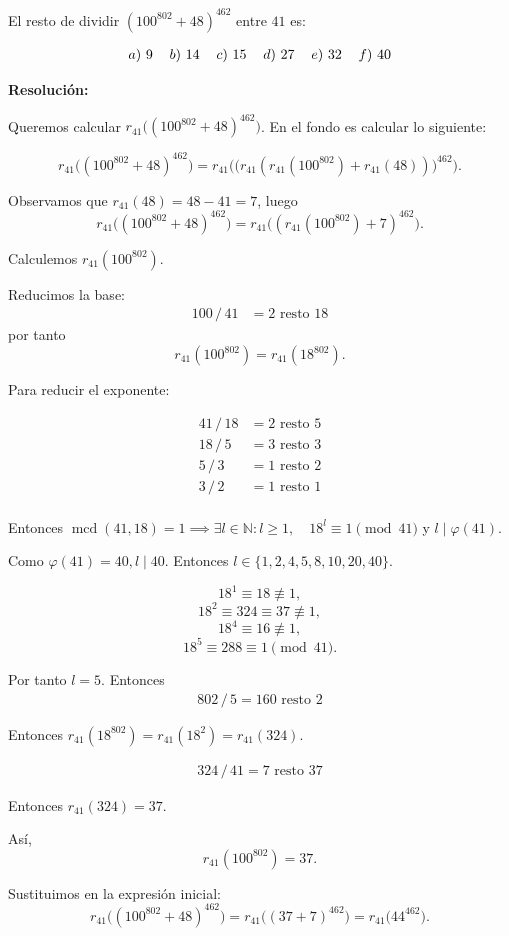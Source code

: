 \documentclass[a4paper,12pt]{article}
\begin{document}
\begin{ejercicioExamen}[title=Ejercicio 4]
El resto de dividir \( (100^{802} + 48)^{462} \) entre \( 41 \) es:

\[
\begin{tabular}{c c c c c c}
$a)$ 9 & $b)$ 14 & $c)$ 15 & $d)$ 27 & $e)$ 32 & $f)$ 40
\end{tabular}
\]

\tcblower
\textbf{Resolución:}

Queremos calcular \(r_{41}\big((100^{802}+48)^{462}\big)\). En el fondo es calcular lo siguiente:

\[
r_{41}\big((100^{802}+48)^{462}\big)
= r_{41}\Big(\big(r_{41}(r_{41}(100^{802})+r_{41}(48))\big)^{462}\Big).
\]

Observamos que \(r_{41}(48)=48-41=7\), luego
\[
r_{41}\big((100^{802}+48)^{462}\big)
= r_{41}\big((r_{41}(100^{802})+7)^{462}\big).
\]

Calculemos \(r_{41}(100^{802})\).

Reducimos la base:
\[
\begin{aligned}
100\,/\,41 &= 2 \text{ resto } 18
\end{aligned}
\]
por tanto
\[
r_{41}(100^{802}) = r_{41}(18^{802}).
\]

Para reducir el exponente:

\[
\begin{aligned}
41\,/\,18 &= 2 \text{ resto } 5 \\
18\,/\,5 &= 3 \text{ resto } 3 \\
5\,/\,3 &= 1 \text{ resto } 2 \\
3\,/\,2 &= 1 \text{ resto } \boxed{1} \\
\end{aligned}
\]

Entonces $\operatorname{mcd}(41,18) = 1 \implies \exists l \in \mathbb{N} : l \ge 1, \quad 18^l \equiv 1 \pmod{41}$ y $l \mid \varphi(41)$.

\vspace{0.5em}

Como $\varphi(41) = 40, l \mid 40$. Entonces \(l \in\{1,2,4,5,8,10,20,40\}\).

\[
18^1 \equiv 18 \not\equiv 1,
\]
\[
18^2 \equiv 324 \equiv 37 \not\equiv 1,
\]
\[
18^4 \equiv 16 \not\equiv 1,
\]
\[
18^5 \equiv 288 \equiv 1 \pmod{41}.
\]

Por tanto \(l=5\). Entonces
\[
\begin{aligned}
802 \, / \, 5 =  160 \text{ resto } 2
\end{aligned}
\]

Entonces $r_{41}(18^{802}) = r_{41}(18^2) = r_{41}(324)$.

\[
\begin{aligned}
324 \, / \, 41 = 7 \text{ resto } 37
\end{aligned}
\]

Entonces $r_{41}(324) = 37$.

Así,
\[
r_{41}(100^{802}) = 37.
\]

Sustituimos en la expresión inicial:
\[
r_{41}\big((100^{802}+48)^{462}\big)
= r_{41}\big((37 + 7)^{462}\big)
= r_{41}\big(44^{462}\big).
\]

\end{ejercicioExamen}
\end{document}
